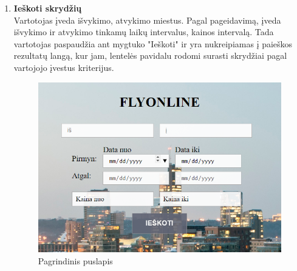 \documentclass{VUMIFPSkursinis}
\begin{document}
                \begin{enumerate}[label=\textbf{U\arabic*}.]

                    \item \textbf{Ieškoti skrydžių}\\
                    Vartotojas įveda išvykimo, atvykimo miestus. Pagal pageidavimą, įveda išvykimo ir atvykimo tinkamų laikų intervalus, kainos intervalą. Tada vartotojas paspaudžia ant mygtuko "Ieškoti" ir yra nukreipiamas į paieškos rezultatų langą, kur jam, lentelės pavidalu rodomi surasti skrydžiai pagal vartojojo įvestus kriterijus.
                    \begin{figure}[H]
                        \centering
                        \includegraphics[scale=0.8]{img/home}
                        \caption{Pagrindinis puslapis}
                        \label{Pagrindinis puslapis}
                    \end{figure}
    

\end{enumerate}
\end{document}
